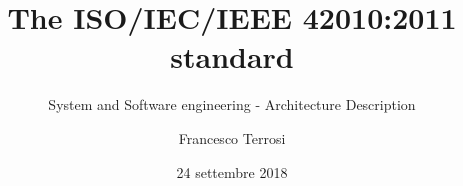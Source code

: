 \documentclass[]{beamer}%
\author{Francesco Terrosi}
\title{The ISO/IEC/IEEE 42010:2011 standard}
\subtitle{System and Software engineering - Architecture Description}
\institute{Università degli studi di Firenze}
\date{24 settembre 2018}
\begin{document}
	
	{\logo{}
	\maketitle}
	
	
	
	
\end{document}
